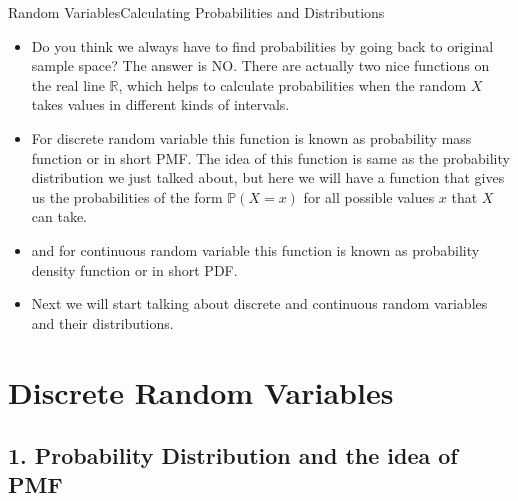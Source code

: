 \documentclass[8pt, usepdftitle = false]{beamer}
\begin{document}
\begin{frame}[allowframebreaks]{Random Variables}{Calculating Probabilities and Distributions}
\begin{itemize}




\framebreak


\item Do you think we always have to find probabilities by going back to original sample space? The answer is NO. There are actually two nice functions on the real line $\mathbb{R}$, which helps to calculate probabilities when the random $X$ takes values in different kinds of intervals.

\item For discrete random variable this function is known as \alert{probability mass function} or in short \alert{PMF}. The idea of this function is same as the probability distribution we just talked about, but here we will have a function that gives us the probabilities of the form $\mathbb{P}(X = x)$ for all possible values $x$ that $X$ can take. 

\item and for continuous random variable this function is known as \alert{probability density function} or in short \alert{PDF}.

\item Next we will start talking about discrete and continuous random variables and their distributions. 





\end{itemize}
\end{frame}



\section{Discrete Random Variables}
\frame{\sectionpage}

\subsection{1. Probability Distribution and the idea of PMF}
\frame{\subsectionpage}
\end{document}
